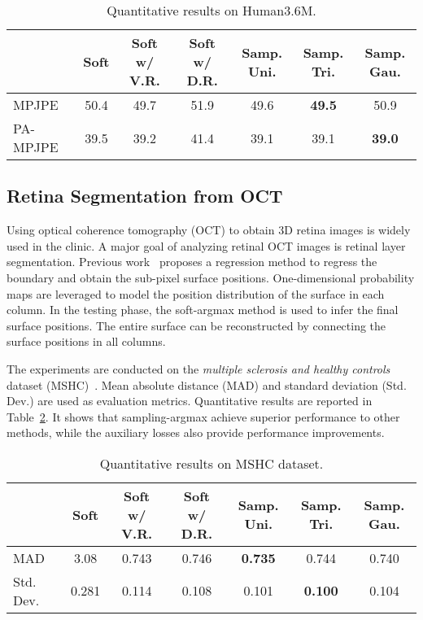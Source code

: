 \documentclass{article}
\begin{document}
\begin{table}[ht]
    \caption{Quantitative results on Human3.6M.}
    \label{tab:h36m}
    \centering
    \begin{tabular}{lcccccc}
        \toprule
        ~ & Soft & Soft w/ V.R. & Soft w/ D.R. & Samp. Uni. & Samp. Tri. & Samp. Gau. \\
        \midrule
        MPJPE~ & 50.4 & 49.7 & 51.9 & {49.6} & \textbf{49.5} & 50.9 \\
        PA-MPJPE~ & 39.5 & 39.2 & 41.4 & 39.1 & 39.1 & \textbf{39.0} \\
        \bottomrule
    \end{tabular}
\end{table}


\subsection{Retina Segmentation from OCT}
Using optical coherence tomography (OCT) to obtain 3D retina images is widely used in the clinic. A major goal of analyzing retinal OCT images is retinal layer segmentation. Previous work~\cite{he2019fully} proposes a regression method to regress the boundary and obtain the sub-pixel surface positions. One-dimensional probability maps are leveraged to model the position distribution of the surface in each column. In the testing phase, the soft-argmax method is used to infer the final surface positions. The entire surface can be reconstructed by connecting the surface positions in all columns.

The experiments are conducted on the \textit{multiple sclerosis and healthy controls} dataset (MSHC)~\cite{he2019retinal}.
Mean absolute distance (MAD) and standard deviation (Std. Dev.) are used as evaluation metrics. Quantitative results are reported in Table~\ref{tab:oct}. It shows that sampling-argmax achieve superior performance to other methods, while the auxiliary losses also provide performance improvements.




\begin{table}[ht]
    \caption{Quantitative results on MSHC dataset.}
    \label{tab:oct}
    \centering
    \begin{tabular}{lcccccc}
        \toprule
        ~ & Soft & Soft w/ V.R. & Soft w/ D.R. & Samp. Uni. & Samp. Tri. & Samp. Gau. \\
        \midrule
        MAD~ & 3.08 & 0.743 & 0.746 & \textbf{0.735} & 0.744 & 0.740 \\
        Std. Dev.~ & 0.281 & 0.114 & 0.108 & 0.101 & \textbf{0.100} & 0.104 \\
\bottomrule
    \end{tabular}
\end{table}
\end{document}
